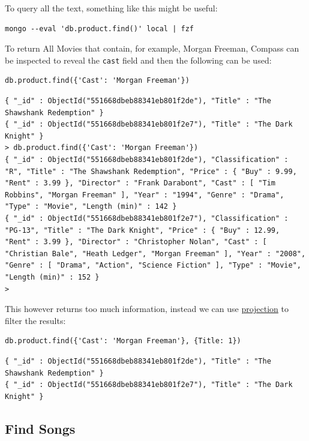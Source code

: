\documentclass[11pt]{article}
\begin{document}
To query all the text, something like this might be useful:

\begin{verbatim}
mongo --eval 'db.product.find()' local | fzf
\end{verbatim}

To return All Movies that contain, for example, Morgan Freeman, Compass can be inspected to reveal the \texttt{cast} field and then the following can be used:
\begin{verbatim}
db.product.find({'Cast': 'Morgan Freeman'})
\end{verbatim}

\begin{verbatim}
{ "_id" : ObjectId("551668dbeb88341eb801f2de"), "Title" : "The Shawshank Redemption" }
{ "_id" : ObjectId("551668dbeb88341eb801f2e7"), "Title" : "The Dark Knight" }
> db.product.find({'Cast': 'Morgan Freeman'})
{ "_id" : ObjectId("551668dbeb88341eb801f2de"), "Classification" : "R", "Title" : "The Shawshank Redemption", "Price" : { "Buy" : 9.99, "Rent" : 3.99 }, "Director" : "Frank Darabont", "Cast" : [ "Tim Robbins", "Morgan Freeman" ], "Year" : "1994", "Genre" : "Drama", "Type" : "Movie", "Length (min)" : 142 }
{ "_id" : ObjectId("551668dbeb88341eb801f2e7"), "Classification" : "PG-13", "Title" : "The Dark Knight", "Price" : { "Buy" : 12.99, "Rent" : 3.99 }, "Director" : "Christopher Nolan", "Cast" : [ "Christian Bale", "Heath Ledger", "Morgan Freeman" ], "Year" : "2008", "Genre" : [ "Drama", "Action", "Science Fiction" ], "Type" : "Movie", "Length (min)" : 152 }
>
\end{verbatim}

This however returns too much information, instead we can use \href{https://docs.mongodb.com/manual/tutorial/project-fields-from-query-results/}{projection} to filter the results:

\begin{verbatim}
db.product.find({'Cast': 'Morgan Freeman'}, {Title: 1})
\end{verbatim}

\begin{verbatim}
{ "_id" : ObjectId("551668dbeb88341eb801f2de"), "Title" : "The Shawshank Redemption" }
{ "_id" : ObjectId("551668dbeb88341eb801f2e7"), "Title" : "The Dark Knight" }
\end{verbatim}

\subsection{Find Songs}
\label{sec:org2e247c6}
\end{document}
